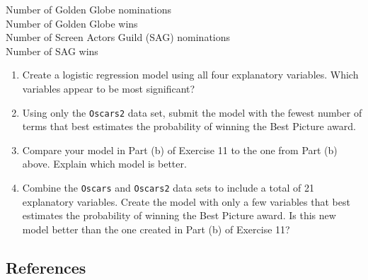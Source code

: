 \documentclass[
]{report}
\begin{document}
\begin{enumerate}
Number of Golden Globe nominations \\
Number of Golden Globe wins \\
Number of Screen Actors Guild (SAG) nominations \\
Number of SAG wins

  \begin{enumerate}
    \item Create a logistic regression model using all four explanatory variables. Which variables appear to be most significant?
    \item Using only the \texttt{Oscars2} data set, submit the model with the fewest number of terms that best estimates the probability of winning the Best Picture award.
    \item Compare your model in Part (b) of Exercise 11 to the one from Part (b) above. Explain which model is better.
    \item Combine the \texttt{Oscars} and \texttt{Oscars2} data sets to include a total of 21 explanatory variables. Create the model with only a few variables that best estimates the probability of winning the Best Picture award. Is this new model better than the one created in Part (b) of Exercise 11?
  \end{enumerate}

\end{enumerate}

\hypertarget{references-5}{%
\subsection*{References}\label{references-5}}
\end{document}
